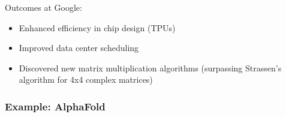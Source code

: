 \begin{frame}
    

    Outcomes at Google:

        \vspace{0.5em}

    \begin{itemize}
        \item Enhanced efficiency in chip design (TPUs)
        \vspace{0.5em}
        \vspace{0.5em}
        \item Improved data center scheduling
        \vspace{0.5em}
        \vspace{0.5em}
        \item Discovered new matrix multiplication algorithms (surpassing
            Strassen's algorithm for 4x4 complex matrices) 
    \end{itemize}

\end{frame}

\begin{frame}\frametitle{Example: AlphaFold}
    
    \begin{figure}
       \centering
    \end{figure}

\end{frame}

